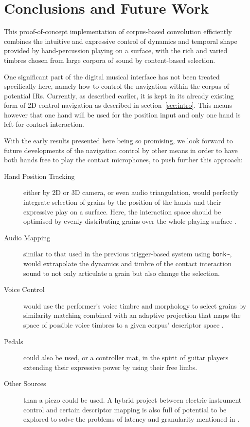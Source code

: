 \section{Conclusions and Future Work}\label{sec:future}

This proof-of-concept implementation of corpus-based convolution efficiently combines the intuitive and expressive control of dynamics and temporal shape provided by hand-percussion playing on a surface, with the rich and varied timbres chosen from large corpora of sound by content-based selection.


One significant part of the digital musical interface has not been treated specifically here, namely how to control the navigation within the corpus of potential IRs. Currently, as described earlier, it is kept in its already existing form of 2D control navigation as described in section~\ref{sec:intro}.
%
This means however that one hand will be used for the position input and only one hand is left for contact interaction.

With the early results presented here being so promising, we look forward to future developments of the navigation control by other means in order to have both hands free to play the contact microphones, to push further this approach:

\begin{description}
\item[Hand Position Tracking] either by 2D or 3D camera, or even audio triangulation, would perfectly integrate selection of grains by the position of the hands and their expressive play on a surface.  Here, the interaction space should be optimised by evenly distributing grains over the whole playing surface \cite{LallemandSchwarz-dafx2011-distribute}.
\item[Audio Mapping] similar to that used in the previous trigger-based system using \verb|bonk~|, would extrapolate the dynamics and timbre of the contact interaction sound to not only articulate a grain but also change the selection.
\item[Voice Control] would use the performer's voice timbre and morphology to select grains by similarity matching combined with an adaptive projection that maps the space of possible voice timbres to a given corpus' descriptor space \cite{StowellPlumbley-smc2010-timbre-remapping-regression-tree,Fasciani-si2013b}.
\item[Pedals] could also be used, or a controller mat, in the spirit of guitar players extending their expressive power by using their free limbs.
\item[Other Sources] than a piezo could be used. A hybrid project between electric instrument control and certain descriptor mapping is also full of potential to be explored to solve the problems of latency and granularity mentioned in \cite{TremblaySchwarz-nime2010-surfing-the-waves}.
\end{description}

